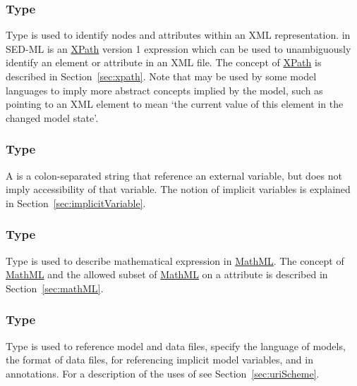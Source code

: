 \subsubsection[\element{XPath}]{Type }
\label{type:xpath}
Type  is  used to identify nodes and attributes within an XML representation.  in SED-ML is an \hyperref[sec:xpath]{XPath} version 1 expression which can be used to unambiguously identify an element or attribute in an XML file. The concept of \hyperref[sec:xpath]{XPath} is described in Section~\ref{sec:xpath}.  Note that  may be used by some model languages to imply more abstract concepts implied by the model, such as pointing to an XML element to mean `the current value of this element in the changed model state'.

\begin{blockChanged}
\subsubsection[\element{URN}]{Type }
\label{type:urn}
A  is a colon-separated string that reference an external variable, but does not imply accessibility of that variable.  The notion of implicit variables is explained in Section~\ref{sec:implicitVariable}.
\end{blockChanged}

\subsubsection[\element{MathML}]{Type }
\label{type:mathml}
Type  is used to describe mathematical expression in \hyperref[sec:mathML]{MathML}. The concept of \hyperref[sec:mathML]{MathML} and the allowed subset of \hyperref[sec:mathML]{MathML} on a  attribute is described in Section~\ref{sec:mathML}.

\subsubsection[\element{anyURI}]{Type }
\label{type:anyURI}
Type  is used to reference model and data files, specify the language of models, the format of data files, for referencing implicit model variables, and in annotations. For a description of the uses of  see Section~\ref{sec:uriScheme}.

